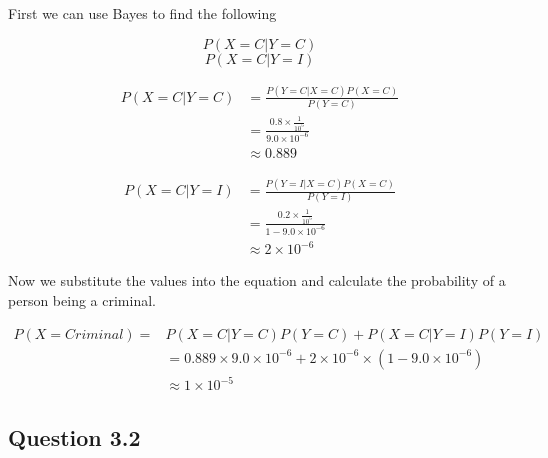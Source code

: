 \documentclass[12pt,letterpaper]{article}
\begin{document}
\begin{enumerate}[(a)]
    First we can use Bayes to find the following
    
    \begin{multicols}{2}
      \begin{equation*}
        P(X = C|Y = C)
      \end{equation*}\break
      \begin{equation*}
        P(X = C|Y = I)
      \end{equation*}
    \end{multicols}
    
    \begin{align*}
    	P(X = C|Y = C) &= \frac{P(Y = C|X = C)P(X=C)}{P(Y=C)} \\
    	&= \frac{0.8\times\frac{1}{10^{5}}}{9.0\times10^{-6}}
    	\\
    	&\approx 0.889 
    \end{align*}
    
    \begin{align*}
    	P(X = C|Y = I) &= \frac{P(Y = I|X = C)P(X=C)}{P(Y=I)} \\
    	&= \frac{0.2\times\frac{1}{10^{5}}}{1 - 9.0\times10^{-6}}
    	\\
    	&\approx 2\times10^{-6}
    \end{align*}
    
    Now we substitute the values into the equation and calculate the probability of a person being a criminal.
    
    \begin{align*}
    	P(X = Criminal) =& P(X = C | Y = C)P(Y = C) + P(X = C | Y = I)P(Y = I) \\
    	&= 0.889\times9.0\times10^{-6} + 2\times10^{-6}\times(1 - 9.0\times10^{-6})\\
    	&\approx 1\times10^{-5}
    \end{align*}
    
\end{enumerate}
\subsection*{Question 3.2}
\end{document}
